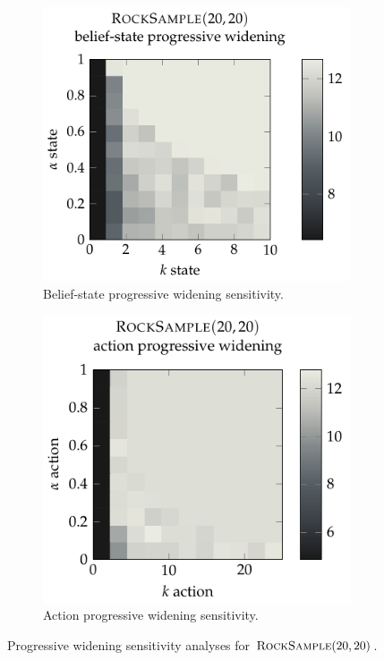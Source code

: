 \begin{figure}[t!]
    \centering
    \begin{subfigure}[t]{0.49\linewidth}
        \centering
        \includegraphics[width=\linewidth]{figures/betazero/appendix/spw_sweep_rs20.pdf}
        \caption{Belief-state progressive widening sensitivity.}
        \label{fig:spw_sensitivity_rs20}
    \end{subfigure}
    \hfill
    \begin{subfigure}[t]{0.47\linewidth}
        \centering
        \includegraphics[width=\linewidth]{figures/betazero/appendix/apw_sweep_rs20.pdf}
        \caption{Action progressive widening sensitivity.}
        \label{fig:apw_sensitivity_rs20}
    \end{subfigure}
    \caption{Progressive widening sensitivity analyses for $\textsc{RockSample}(20,20)$.}
    \label{fig:pw_sensitivity_rs20}
\end{figure}

